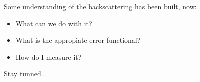 \begin{frame} 
         
 \begin{columns} 
	    
 \end{columns} 
\end{frame} 



\begin{frame} 
         
 \begin{columns} 
	    
 \end{columns} 
\end{frame} 

\begin{frame} \end{frame}
\begin{frame} 
         
 \begin{columns} 
	    
 \end{columns} 
\end{frame} 




\begin{frame}
Some understanding of the backscattering has been built, now:
\begin{itemize}
	\item What can we do with it?
	\item What is the appropiate error functional?
	\item How do I measure it?
\end{itemize}
Stay tunned...
\end{frame}




